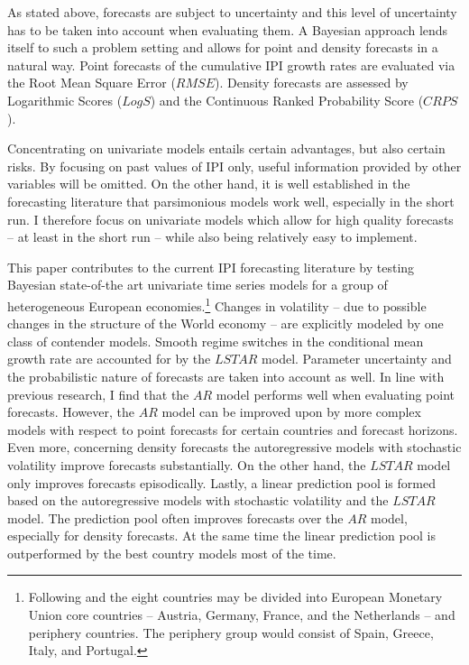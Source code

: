 \documentclass[12pt,letterpaper,fleqn]{article}           %
\begin{document}
As stated above, forecasts are subject to uncertainty and this level of uncertainty has to be taken into account when evaluating them. A Bayesian approach lends itself to such a problem setting and allows for point and density forecasts in a natural way. Point forecasts of the cumulative IPI growth rates are evaluated via the Root Mean Square Error ($RMSE$). Density forecasts are assessed by Logarithmic Scores ($LogS$) and the Continuous Ranked Probability Score ($CRPS$). 

Concentrating on univariate models entails certain advantages, but also certain risks. By focusing on past values of IPI only, useful information provided by other variables will be omitted. On the other hand, it is well established in the forecasting literature that parsimonious models work well, especially in the short run. 
I therefore focus on univariate models which allow for high quality forecasts -- at least in the short run -- while also being relatively easy to implement.

This paper contributes to the current IPI forecasting literature by testing Bayesian state-of-the art univariate time series models for a group of heterogeneous European economies.\footnote{Following \textcite{desantis16} and \textcite{semmler18} the eight countries may be divided into European Monetary Union core countries -- Austria, Germany, France, and the Netherlands -- and periphery countries. The periphery group would consist of Spain, Greece, Italy, and Portugal.} Changes in volatility -- due to possible changes in the structure of the World economy -- are explicitly modeled by one class of contender models. Smooth regime switches in the conditional mean growth rate are accounted for by the $LSTAR$ model. Parameter uncertainty and the probabilistic nature of forecasts are taken into account as well. In line with previous research, I find that the $AR$ model performs well when evaluating point forecasts. However, the $AR$ model can be improved upon by more complex models with respect to point forecasts for certain countries and forecast horizons. Even more, concerning density forecasts the autoregressive models with stochastic volatility improve forecasts substantially. On the other hand, the $LSTAR$ model only improves forecasts episodically. Lastly, a linear prediction pool is formed based on the autoregressive models with stochastic volatility and the $LSTAR$ model. The prediction pool often improves forecasts over the $AR$ model, especially for density forecasts. At the same time the linear prediction pool is outperformed by the best country models most of the time.
\end{document}
